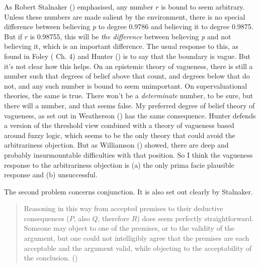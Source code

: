 \documentclass[
  11pt,
  letterpaper,
  DIV=11,
  numbers=noendperiod,
  oneside]{scrartcl}
\begin{document}
As Robert Stalnaker () emphasised,
any number \(r\) is bound to seem arbitrary. Unless these numbers are
made salient by the environment, there is no special difference between
believing \emph{p} to degree 0.9786 and believing it to degree 0.9875.
But if \(r\) is 0.98755, this will be \emph{the difference} between
believing \emph{p} and not believing it, which is an important
difference. The usual response to this, as found in Foley
( Ch. 4) and Hunter
() is to say that the boundary is vague.
But it's not clear how this helps. On an epistemic theory of vagueness,
there is still a number such that degrees of belief above that count,
and degrees below that do not, and any such number is bound to seem
unimportant. On supervaluational theories, the same is true. There won't
be a \emph{determinate} number, to be sure, but there will a number, and
that seems false. My preferred degree of belief theory of vagueness, as
set out in Weatherson () has
the same consequence. Hunter defends a version of the threshold view
combined with a theory of vagueness based around fuzzy logic, which
seems to be the only theory that could avoid the arbitrariness
objection. But as Williamson ()
showed, there are deep and probably insurmountable difficulties with
that position. So I think the vagueness response to the arbitrariness
objection is (a) the only prima facie plausible response and (b)
unsuccessful.

The second problem concerns conjunction. It is also set out clearly by
Stalnaker.

\begin{quote}
Reasoning in this way from accepted premises to their deductive
consequences (\(P\), also \(Q\), therefore \(R\)) does seem perfectly
straightforward. Someone may object to one of the premises, or to the
validity of the argument, but one could not intelligibly agree that the
premises are each acceptable and the argument valid, while objecting to
the acceptability of the conclusion.
()
\end{quote}
\end{document}
